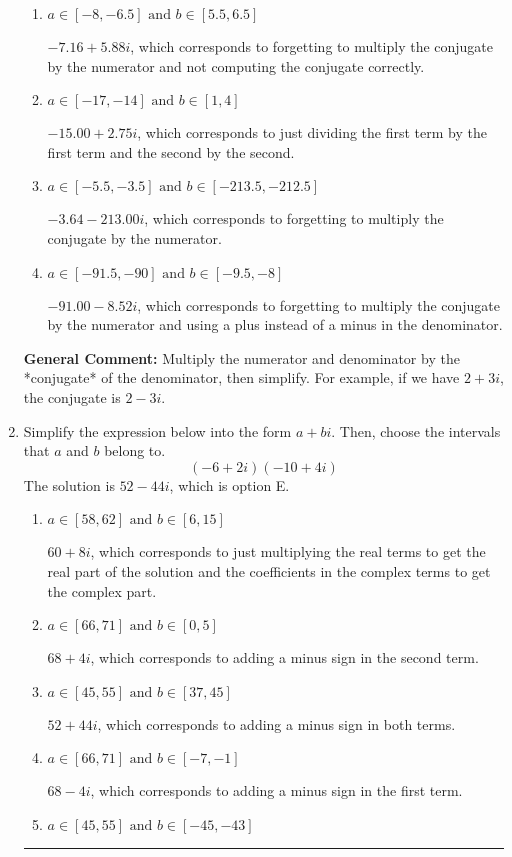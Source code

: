 \documentclass{extbook}[14pt]
\newcommand{\litem}[1]{\item #1

\rule{\textwidth}{0.4pt}}
\begin{document}
\begin{enumerate}
{\begin{enumerate}[label=\Alph*.]
* $-3.64  - 8.52 i$, which is the correct option.
\item \( a \in [-8, -6.5] \text{ and } b \in [5.5, 6.5] \)

 $-7.16  + 5.88 i$, which corresponds to forgetting to multiply the conjugate by the numerator and not computing the conjugate correctly.
\item \( a \in [-17, -14] \text{ and } b \in [1, 4] \)

 $-15.00  + 2.75 i$, which corresponds to just dividing the first term by the first term and the second by the second.
\item \( a \in [-5.5, -3.5] \text{ and } b \in [-213.5, -212.5] \)

 $-3.64  - 213.00 i$, which corresponds to forgetting to multiply the conjugate by the numerator.
\item \( a \in [-91.5, -90] \text{ and } b \in [-9.5, -8] \)

 $-91.00  - 8.52 i$, which corresponds to forgetting to multiply the conjugate by the numerator and using a plus instead of a minus in the denominator.
\end{enumerate}

\textbf{General Comment:} Multiply the numerator and denominator by the *conjugate* of the denominator, then simplify. For example, if we have $2+3i$, the conjugate is $2-3i$.
}
\litem{
Simplify the expression below into the form $a+bi$. Then, choose the intervals that $a$ and $b$ belong to.
\[ (-6 + 2 i)(-10 + 4 i) \]The solution is \( 52 - 44 i \), which is option E.\begin{enumerate}[label=\Alph*.]
\item \( a \in [58, 62] \text{ and } b \in [6, 15] \)

 $60 + 8 i$, which corresponds to just multiplying the real terms to get the real part of the solution and the coefficients in the complex terms to get the complex part.
\item \( a \in [66, 71] \text{ and } b \in [0, 5] \)

 $68 + 4 i$, which corresponds to adding a minus sign in the second term.
\item \( a \in [45, 55] \text{ and } b \in [37, 45] \)

 $52 + 44 i$, which corresponds to adding a minus sign in both terms.
\item \( a \in [66, 71] \text{ and } b \in [-7, -1] \)

 $68 - 4 i$, which corresponds to adding a minus sign in the first term.
\item \( a \in [45, 55] \text{ and } b \in [-45, -43] \)


\end{enumerate}}
\end{enumerate}
\end{document}
